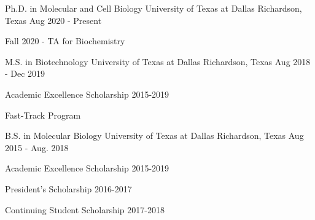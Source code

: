 

\begin{cventries}

	\cventry
	{Ph.D. in Molecular and Cell Biology} %
	{University of Texas at Dallas} %
	{Richardson, Texas} %
	{Aug 2020 - Present} %
	{
		\begin{cvitems} %
            Fall 2020 - TA for Biochemistry
		\end{cvitems}
	}

	\cventry
	{M.S. in Biotechnology} %
	{University of Texas at Dallas} %
	{Richardson, Texas} %
	{Aug 2018 - Dec 2019} %
	{
		\begin{cvitems} %
			\item {Academic Excellence Scholarship 2015-2019}
			\item {Fast-Track Program}
		\end{cvitems}
	}

	\cventry
	{B.S. in Molecular Biology} %
	{University of Texas at Dallas} %
	{Richardson, Texas} %
	{Aug 2015 - Aug. 2018} %
	{
		\begin{cvitems} %
			\item {Academic Excellence Scholarship 2015-2019}
			\item {President's Scholarship 2016-2017}
			\item {Continuing Student Scholarship 2017-2018}
		\end{cvitems}
	}

\end{cventries}
